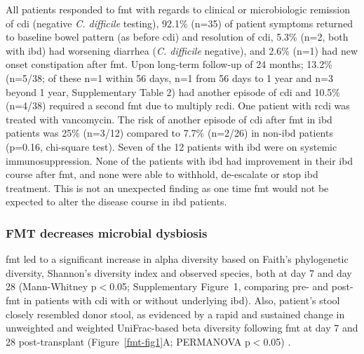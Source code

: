 All patients responded to \gls{fmt} with regards to clinical or microbiologic remission of \gls{cdi} (negative \textit{C. difficile} testing), 92.1\% (n=35) of patient symptoms returned to baseline bowel pattern (as before \gls{cdi}) and resolution of \gls{cdi}, 5.3\% (n=2, both with \gls{ibd}) had worsening diarrhea (\textit{C. difficile} negative), and 2.6\% (n=1) had new onset constipation after \gls{fmt}. Upon long-term follow-up of 24 months; 13.2\% (n=5/38; of these n=1 within 56 days, n=1 from 56 days to 1 year and n=3 beyond 1 year, Supplementary Table 2) had another episode of \gls{cdi} and 10.5\% (n=4/38) required a second \gls{fmt} due to multiply \gls{rcdi}. One patient with \gls{rcdi} was treated with vancomycin. The risk of another episode of \gls{cdi} after \gls{fmt} in \gls{ibd} patients was 25\% (n=3/12) compared to 7.7\% (n=2/26) in non-\gls{ibd} patients (p=0.16, chi-square test). Seven of the 12 patients with \gls{ibd} were on systemic immunosuppression. None of the patients with \gls{ibd} had improvement in their \gls{ibd} course after \gls{fmt}, and none were able to withhold, de-escalate or stop \gls{ibd} treatment. This is not an unexpected finding as one time \gls{fmt} would not be expected to alter the disease course in \gls{ibd} patients.

\subsubsection{FMT decreases microbial dysbiosis}
\gls{fmt} led to a significant increase in alpha diversity based on Faith's phylogenetic diversity, Shannon's diversity index and observed species, both at day 7 and day 28 (Mann-Whitney p$<$0.05; Supplementary Figure~1, comparing pre- and post-\gls{fmt} in patients with \gls{cdi} with or without underlying \gls{ibd}).  Also, patient's stool closely resembled donor stool, as evidenced by a rapid and sustained change in unweighted and weighted UniFrac-based beta diversity following \gls{fmt} at day 7 and 28 post-transplant (Figure~\ref{fmt-fig1}A; PERMANOVA p$<$0.05) \cite{RN83}. 


